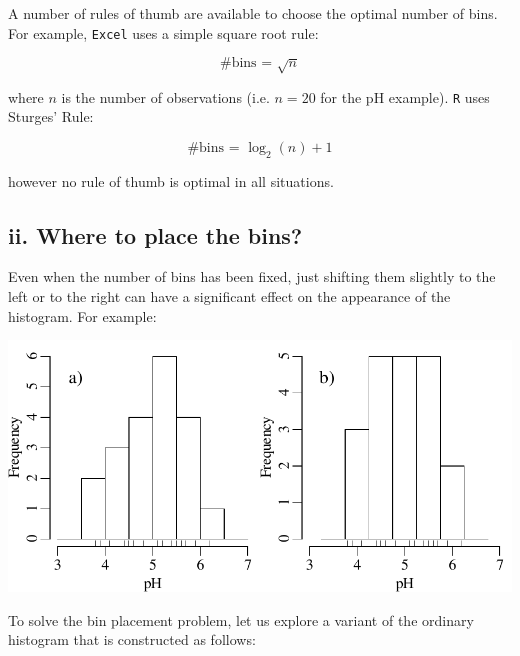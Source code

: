 A number of rules of thumb are available to choose the optimal number
of bins. For example, \texttt{Excel} uses a simple square root rule:

\begin{equation}
  \mbox{\#{bins} = } \sqrt{n}
\end{equation}

\noindent where $n$ is the number of observations (i.e. $n = 20$ for
the pH example). \texttt{R} uses Sturges' Rule:

\begin{equation}
  \mbox{\#{bins} = } \log_2(n) + 1
\end{equation}

\noindent however no rule of thumb is optimal in all situations.

\subsection*{ii. Where to place the bins?}

Even when the number of bins has been fixed, just shifting them
slightly to the left or to the right can have a significant effect on
the appearance of the histogram. For example:

\noindent\begin{minipage}[t][][b]{.5\textwidth}
  \includegraphics[width=\textwidth]{../figures/binpos.pdf}\\
\end{minipage}
\begin{minipage}[t][][t]{.5\textwidth}
  \label{fig:binpos}
\end{minipage}
  
To solve the bin placement problem, let us explore a variant of the
ordinary histogram that is constructed as follows:

